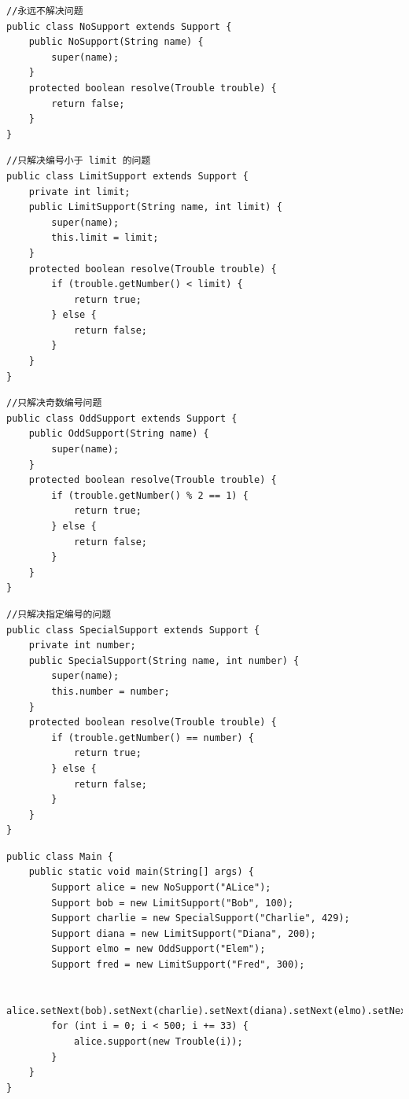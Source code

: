 \begin{lstlisting}
//永远不解决问题
public class NoSupport extends Support {
	public NoSupport(String name) {
		super(name);
	}
	protected boolean resolve(Trouble trouble) {
		return false;
	}
}
\end{lstlisting}
\begin{lstlisting}
//只解决编号小于 limit 的问题
public class LimitSupport extends Support {
	private int limit;
	public LimitSupport(String name, int limit) {
		super(name);
		this.limit = limit;
	}
	protected boolean resolve(Trouble trouble) {
		if (trouble.getNumber() < limit) {
			return true;
		} else {
			return false;
		}
	}
}
\end{lstlisting}
\begin{lstlisting}
//只解决奇数编号问题
public class OddSupport extends Support {
	public OddSupport(String name) {
		super(name);
	}
	protected boolean resolve(Trouble trouble) {
		if (trouble.getNumber() % 2 == 1) {
			return true;
		} else {
			return false;
		}
	}
}
\end{lstlisting}
\begin{lstlisting}
//只解决指定编号的问题
public class SpecialSupport extends Support {
	private int number;
	public SpecialSupport(String name, int number) {
		super(name);
		this.number = number;
	}
	protected boolean resolve(Trouble trouble) {
		if (trouble.getNumber() == number) {
			return true;
		} else {
			return false;
		}
	}
}
\end{lstlisting}
\begin{lstlisting}
public class Main {
	public static void main(String[] args) {
		Support alice = new NoSupport("ALice");
		Support bob = new LimitSupport("Bob", 100);
		Support charlie = new SpecialSupport("Charlie", 429);
		Support diana = new LimitSupport("Diana", 200);
		Support elmo = new OddSupport("Elem");
		Support fred = new LimitSupport("Fred", 300);
		
		alice.setNext(bob).setNext(charlie).setNext(diana).setNext(elmo).setNext(fred);
		for (int i = 0; i < 500; i += 33) {
			alice.support(new Trouble(i));
		}
	}
}
\end{lstlisting}

